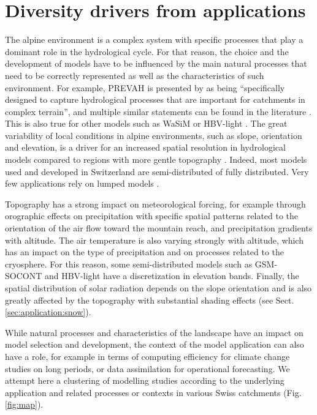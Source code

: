 \documentclass[10pt,a4paper]{article}
\begin{document}
\section{Diversity drivers from applications}
\label{sec:application}

The alpine environment is a complex system with specific processes that play a dominant role in the hydrological cycle. For that reason, the choice and the development of models have to be influenced by the main natural processes that need to be correctly represented as well as the characteristics of such environment. For example, PREVAH is presented by \citet{Anghileri2019} as being “specifically designed to capture hydrological processes that are important for catchments in complex terrain”, and multiple similar statements can be found in the literature \citep{Verbunt2007, Zappa2007a, Koplin2010,  Brunner2019e}. This is also true for other models such as WaSiM \citep{Jasper2002, Jasper2003, Thornton2021} or HBV-light \citep{Sikorska-Senoner2020}. The great variability of local conditions in alpine environments, such as slope, orientation and elevation, is a driver for an increased spatial resolution in hydrological models compared to regions with more gentle topography \citep{Gurtz2003}. Indeed, most models used and developed in Switzerland are semi-distributed of fully distributed. Very few applications rely on lumped models \citep[for example,][]{Keller2019a}.

Topography has a strong impact on meteorological forcing, for example through orographic effects on precipitation with specific spatial patterns related to the orientation of the air flow toward the mountain reach, and precipitation gradients with altitude. The air temperature is also varying strongly with altitude, which has an impact on the type of precipitation and on processes related to the cryosphere. For this reason, some semi-distributed models such as GSM-SOCONT and HBV-light have a discretization in elevation bands. Finally, the spatial distribution of solar radiation depends on the slope orientation and is also greatly affected by the topography with substantial shading effects (see Sect. \ref{sec:application:snow}).

While natural processes and characteristics of the landscape have an impact on model selection and development, the context of the model application can also have a role, for example in terms of computing efficiency for climate change studies on long periods, or data assimilation for operational forecasting. We attempt here a clustering of modelling studies according to the underlying application and related processes or contexts in various Swiss catchments (Fig. \ref{fig:map}).
\end{document}
